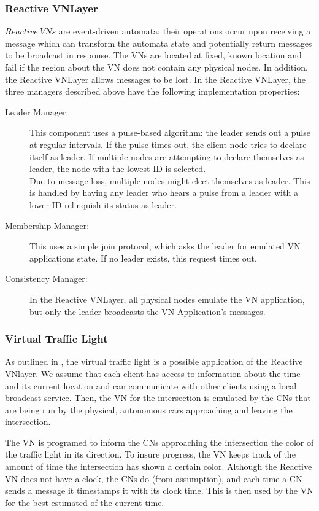 \documentclass[12pt]{article}
\begin{document}
\subsubsection{Reactive VNLayer}
$Reactive\ VNs$ are event-driven automata: their operations occur upon receiving a message which can transform the automata state and potentially return messages to be broadcast in response.  The VNs are located at fixed, known location and fail if the region about the VN does not contain any physical nodes.  In addition, the Reactive VNLayer allows messages to be lost.  
In the Reactive VNLayer, the three managers described above have the following implementation properties: 
\begin{description}
\item[Leader Manager:] This component uses a pulse-based algorithm: the leader sends out a pulse at regular intervals.  If the pulse times out, the client node tries to declare itself as leader.  If multiple nodes are attempting to declare themselves as leader, the node with the lowest ID is selected.  \\
Due to message loss, multiple nodes might elect themselves as leader. This is handled by having any leader who hears a pulse from a  leader with a lower ID relinquish its status as leader.  
\item[Membership Manager:] This uses a simple join protocol, which asks the leader for emulated VN applications state.  If no leader exists, this request times out. 
\item[Consistency Manager:]In the Reactive VNLayer, all physical nodes emulate the VN application, but only the leader broadcasts the VN Application's messages.  
\end{description}
\subsubsection{Virtual Traffic Light}
As outlined in \cite{vnlayer}, the virtual traffic light is a possible application of the Reactive VNlayer.  We assume that each client has access to information about the time and its current location and can communicate with other clients using a local broadcast service. Then, the VN for the intersection is emulated by the CNs that are being run by the physical, autonomous cars approaching and leaving the intersection. 

The VN is programed to inform the CNs approaching the intersection the color of the traffic light in its direction.  To insure progress, the VN keeps track of the amount of time the intersection has shown a certain color.  Although the Reactive VN does not have a clock, the CNs do  (from assumption), and each time a CN sends a message it timestamps it with its clock time.  This is then used by the VN for the best estimated of the current time.   
\end{document}
